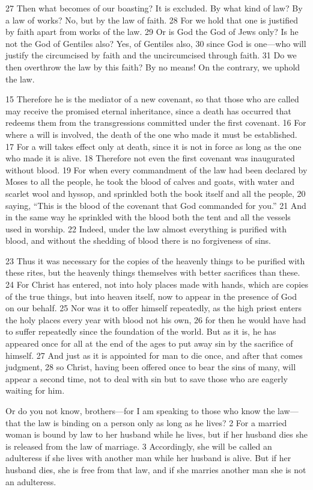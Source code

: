 \begin{bible}
27 Then what becomes of our boasting? It is excluded. By what kind of law? By a law of works? No, but by the law of faith. 28 For we hold that one is justified by faith apart from works of the law. 29 Or is God the God of Jews only? Is he not the God of Gentiles also? Yes, of Gentiles also, 30 since God is one—who will justify the circumcised by faith and the uncircumcised through faith. 31 Do we then overthrow the law by this faith? By no means! On the contrary, we uphold the law.

15 Therefore he is the mediator of a new covenant, so that those who are called may receive the promised eternal inheritance, since a death has occurred that redeems them from the transgressions committed under the first covenant. 16 For where a will is involved, the death of the one who made it must be established. 17 For a will takes effect only at death, since it is not in force as long as the one who made it is alive. 18 Therefore not even the first covenant was inaugurated without blood. 19 For when every commandment of the law had been declared by Moses to all the people, he took the blood of calves and goats, with water and scarlet wool and hyssop, and sprinkled both the book itself and all the people, 20 saying, ``This is the blood of the covenant that God commanded for you.'' 21 And in the same way he sprinkled with the blood both the tent and all the vessels used in worship. 22 Indeed, under the law almost everything is purified with blood, and without the shedding of blood there is no forgiveness of sins.

23 Thus it was necessary for the copies of the heavenly things to be purified with these rites, but the heavenly things themselves with better sacrifices than these. 24 For Christ has entered, not into holy places made with hands, which are copies of the true things, but into heaven itself, now to appear in the presence of God on our behalf. 25 Nor was it to offer himself repeatedly, as the high priest enters the holy places every year with blood not his own, 26 for then he would have had to suffer repeatedly since the foundation of the world. But as it is, he has appeared once for all at the end of the ages to put away sin by the sacrifice of himself. 27 And just as it is appointed for man to die once, and after that comes judgment, 28 so Christ, having been offered once to bear the sins of many, will appear a second time, not to deal with sin but to save those who are eagerly waiting for him.

Or do you not know, brothers—for I am speaking to those who know the law—that the law is binding on a person only as long as he lives? 2 For a married woman is bound by law to her husband while he lives, but if her husband dies she is released from the law of marriage. 3 Accordingly, she will be called an adulteress if she lives with another man while her husband is alive. But if her husband dies, she is free from that law, and if she marries another man she is not an adulteress.


\end{bible}
